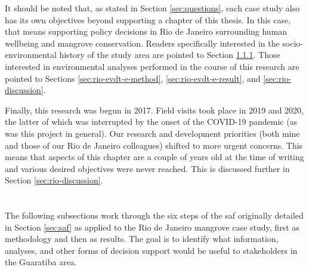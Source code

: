 It should be noted that, as stated in Section \ref{sec:questions}, each case study also has its own objectives beyond supporting a chapter of this thesis. In this case, that means supporting policy decisions in Rio de Janeiro surrounding human wellbeing and mangrove conservation. Readers specifically interested in the socio-environmental history of the study area are pointed to Section \ref{sec:rio-context}. Those interested in environmental analyses performed in the course of this research are pointed to Sections \ref{sec:rio-evdt-e-method}, \ref{sec:rio-evdt-e-result}, and \ref{sec:rio-discussion}.

Finally, this research was begun in 2017. Field visits took place in 2019 and 2020, the latter of which was interrupted by the onset of the COVID-19 pandemic (as was this project in general). Our research and development priorities (both mine and those of our Rio de Janeiro colleagues) shifted to more urgent concerns. This means that aspects of this chapter are a couple of years old at the time of writing and various desired objectives were never reached. This is discussed further in Section \ref{sec:rio-discussion}.


\section{} \label{sec:rio-saf}

The following subsections work through the six steps of the \ac{saf} originally detailed in Section \ref{sec:saf} as applied to the Rio de Janeiro mangrove case study, first as methodology and then as results. The goal is to identify what information, analyses, and other forms of decision support would be useful to stakeholders in the Guaratiba area.

\subsection{} \label{sec:rio-saf-method}

\subsubsection{} \label{sec:rio-context}

